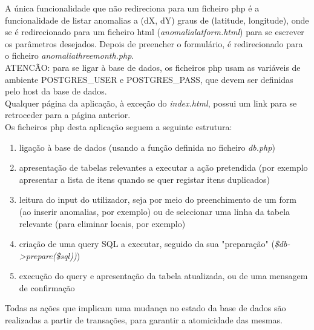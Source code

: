 \documentclass[12pt]{report}
\begin{document}
    \hspace*{1em} A única funcionalidade que não redireciona para um ficheiro php é a funcionalidade de listar anomalias a (dX, dY) graus de (latitude, longitude), onde se é redirecionado para um ficheiro html (\textit{anomalialatform.html})
    para se escrever os parâmetros desejados. Depois de preencher o formulário, é redirecionado para o ficheiro \textit{anomaliathreemonth.php}. \\

    \hspace*{1em} ATENCÃO: para se ligar à base de dados, os ficheiros php usam as variáveis de ambiente POSTGRES\_USER e POSTGRES\_PASS, que devem ser definidas pelo host da base de dados. \\

    \hspace*{1em} Qualquer página da aplicação, à exceção do \textit{index.html}, possui um link para se retroceder para a página anterior.\\

    \hspace*{1em} Os ficheiros php desta aplicação seguem a seguinte estrutura:
    \begin{enumerate}
        \item ligação à base de dados (usando a função definida no ficheiro \textit{db.php})
        \item apresentação de tabelas relevantes a executar a ação pretendida (por exemplo apresentar a lista de itens quando se quer registar itens duplicados)
        \item leitura do input do utilizador, seja por meio do preenchimento de um form (ao inserir anomalias, por exemplo) ou de selecionar uma linha da tabela relevante (para eliminar locais, por exemplo)
        \item criação de uma query SQL a executar, seguido da sua "preparação" (\textit{\$db->prepare(\$sql))})
        \item execução do query e apresentação da tabela atualizada, ou de uma mensagem de confirmação
        
    \end{enumerate}

    \hspace*{1em} Todas as ações que implicam uma mudança no estado da base de dados são realizadas a partir de transações, para garantir a atomicidade das mesmas. \\
\end{document}
